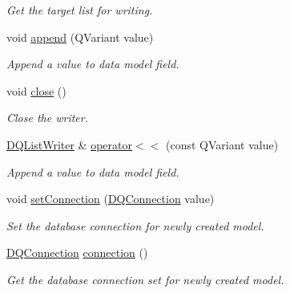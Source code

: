 \begin{DoxyCompactItemize}
\begin{DoxyCompactList}\small\item\em Get the target list for writing. \item\end{DoxyCompactList}\item 
\hypertarget{classDQListWriter_a0760f9b9ca173fc4516ec91c12031b2c}{
void \hyperlink{classDQListWriter_a0760f9b9ca173fc4516ec91c12031b2c}{append} (QVariant value)}
\label{classDQListWriter_a0760f9b9ca173fc4516ec91c12031b2c}

\begin{DoxyCompactList}\small\item\em Append a value to data model field. \item\end{DoxyCompactList}\item 
\hypertarget{classDQListWriter_ab4ace956b3bd520c68a6abbb6828e199}{
void \hyperlink{classDQListWriter_ab4ace956b3bd520c68a6abbb6828e199}{close} ()}
\label{classDQListWriter_ab4ace956b3bd520c68a6abbb6828e199}

\begin{DoxyCompactList}\small\item\em Close the writer. \item\end{DoxyCompactList}\item 
\hyperlink{classDQListWriter}{DQListWriter} \& \hyperlink{classDQListWriter_a140ea8cfafa768c3c0e2d1d0c3d855fd}{operator$<$$<$} (const QVariant value)
\begin{DoxyCompactList}\small\item\em Append a value to data model field. \item\end{DoxyCompactList}\item 
void \hyperlink{classDQListWriter_a88f4bf2ea7d855e86627da6478c5cd1f}{setConnection} (\hyperlink{classDQConnection}{DQConnection} value)
\begin{DoxyCompactList}\small\item\em Set the database connection for newly created model. \item\end{DoxyCompactList}\item 
\hypertarget{classDQListWriter_a90b0a3f1a599daf9510125e86df67f71}{
\hyperlink{classDQConnection}{DQConnection} \hyperlink{classDQListWriter_a90b0a3f1a599daf9510125e86df67f71}{connection} ()}
\label{classDQListWriter_a90b0a3f1a599daf9510125e86df67f71}

\begin{DoxyCompactList}\small\item\em Get the database connection set for newly created model. \item\end{DoxyCompactList}\end{DoxyCompactItemize}

